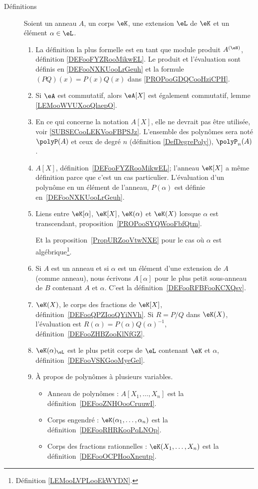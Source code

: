 
\begin{description}
	\item[Définitions]
		Soient un anneau \( A\), un corps \( \eK\), une extension \( \eL\) de \( \eK\) et un élément \( \alpha\in \eL\).
		\begin{enumerate}
			\item
			      La définition la plus formelle est en tant que module produit \( A^{(\eN)}\), définition \ref{DEFooFYZRooMikwEL}. Le produit et l'évaluation sont définis en \ref{DEFooNXKUooLrGeuh} et la formule \( (PQ)(x)=P(x)Q(x)\) dans \ref{PROPooGDQCooHziCPH}.
			\item
			      Si \( \eA\) est commutatif, alors \( \eA[X]\) est également commutatif, lemme \ref{LEMooWVUXooQlaepO}.
			\item
			      En ce qui concerne la notation \( A[X]\), elle ne devrait pas être utilisée, voir \ref{SUBSECooLEKVooFBPSJz}. L'ensemble des polynômes sera noté \( \polyP(A)\) et ceux de degré \( n\) (définition \ref{DefDegrePoly}), \( \polyP_n(A)\).
			\item
			      \( A[X]\), définition~\ref{DEFooFYZRooMikwEL}; l'anneau \( \eK[X]\) a même définition parce que c'est un cas particulier. L'évaluation d'un polynôme en un élément de l'anneau, \( P(\alpha)\) est définie en~\ref{DEFooNXKUooLrGeuh}.
			\item
			      Liens entre \( \eK[\alpha]\), \( \eK[X]\), \( \eK(\alpha)\) et \( \eK(X)\) lorsque \( \alpha\) est transcendant, proposition~\ref{PROPooSYQWooFbfQtm}.

			      Et la proposition~\ref{PropURZooVtwNXE} pour le cas où \( \alpha\) est algébrique\footnote{Définition \ref{LEMooLVPLooEkWYDN}.}.
			\item
			      Si \( A\) est un anneau et si \( \alpha\) est un élément d'une extension de \( A\) (comme anneau), nous écrivons \( A[\alpha]\) pour le plus petit sous-anneau de \( B\) contenant \( A\) et \( \alpha\). C'est la définition~\ref{DEFooRFBFooKCXQsv}.
			\item
			      \( \eK(X)\), le corps des fractions de \( \eK[X]\), définition~\ref{DEFooQPZIooQYiNVh}. Si \( R=P/Q\) dans \( \eK(X)\), l'évaluation est \( R(\alpha)=P(\alpha)Q(\alpha)^{-1}\), définition~\ref{DEFooZHBZooKlNfGZ}.
			\item
			      \( \eK(\alpha)_{\eL}\) est le plus petit corps de \( \eL\) contenant \( \eK\) et \( \alpha\), définition~\ref{DEFooVSKGooMyeGel}.
			\item
			      À propos de polynômes à plusieurs variables.
			      \begin{itemize}
				      \item Anneau de polynômes : \( A[X_1,\ldots, X_n]\) est la définition~\ref{DEFooZNHOooCruuwI}.
				      \item Corps engendré : \( \eK(\alpha_1,\ldots, \alpha_n)\) est la définition~\ref{DEFooRHRKooPqLNOp}.
				      \item Corps des fractions rationnelles : \( \eK(X_1,\ldots, X_n)\) est la définition~\ref{DEFooOCPHooXneutp}.
			      \end{itemize}
		\end{enumerate}


\end{description}
